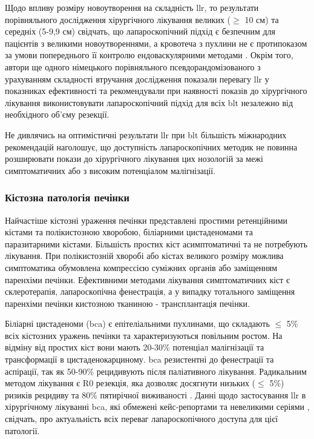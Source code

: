 \begin{refsection}
Щодо впливу розміру новоутворення на складність \acrshort{llr}, то результати порівняльного дослідження хірургічного лікування великих ($\geq$ 10 см) та середніх (5-9,9 см) свідчать, що лапароскопічний підхід є безпечним для пацієнтів з великими новоутвореннями, а кровотеча з пухлини не є протипоказом за умови попереднього її контролю ендоваскулярними методами \cite{McKay2020}. Окрім того, автори ще одного німецького порівняльного псевдорандомізованого з урахуванням складності втручання дослідження показали перевагу \acrshort{llr} у показниках ефективності та рекомендували при наявності показів до хірургічного лікування виконистовувати лапароскопічний підхід для всіх \acrshort{blt} незалежно від необхідного об'єму резекції.

Не дивлячись на оптимістичні результати \acrshort{llr} при \acrshort{blt} більшість міжнародних рекомендацій наголошує, що доступність лапароскопічних методик не повинна розширювати покази до хірургічного лікування цих нозологій за межі симптоматичних або з високим потенціалом малігнізації.

\subsubsection{Кістозна патологія печінки}

Найчастіше кістозні ураження печінки представлені простими ретенційними кістами та полікистозною хворобою, біліарними цистаденомами та паразитарними кістами. Більшість простих кіст асимптоматичні та не потребують лікування. При полікистозній хворобі або кістах великого розміру можлива симптоматика обумовлена компрессією суміжних органів або заміщенням паренхіми печінки. Ефективними методами лікування симптоматичних кіст є склеротерапія, лапароскопічна фенестрація, а у випадку тотального заміщення паренхіми печінки кистозною тканиною - трансплантація печінки. 

Біліарні цистаденоми (\acrshort{bca}) є епітеліальними пухлинами, що складають $\leq$ 5\% всіх кістозних уражень печінки та характеризуються повільним ростом. На відміну від простих кіст вони  мають 20-30\% потенціал малігнізації та трансформації в цистаденокарциному. \acrshort{bca} резистентні до фенестрації та аспірації, так як 50-90\% рецидивують після паліативного лікування. Радикальним методом лікування є R0 резекція, яка дозволяє досягнути низьких ($\leq$ 5\%) ризиків рецидиву та 80\% пятирічної виживаності \cite{Soares2015}. Данні щодо застосування \acrshort{llr} в хірургічному лікуванні \acrshort{bca}, які обмежені кейс-репортами \cite{Machado2014, Li2016a} та невеликими серіями \cite{Koffron2004}, свідчать, про актуальність всіх переваг лапароскопічного доступа для цієї патології.


\end{refsection}
